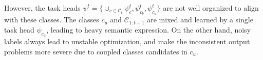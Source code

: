 







\iffalse
However, the task heads $\psi^t = \{\cup_{c\in\mathcal{C}_t}\psi_c^t, \psi_{c_b}^t, \psi_{c_u}^t\}$ are not well organized to align with these classes. The classes $c_u$ and $\mathcal{C}_{1:t-1}$ are mixed and learned by a single task head $\psi_{c_u}$, leading to heavy semantic expression. On the other hand, noisy labels always lead to unstable optimization, and make the inconsistent output problems more severe due to coupled classes candidates in $c_u$.

